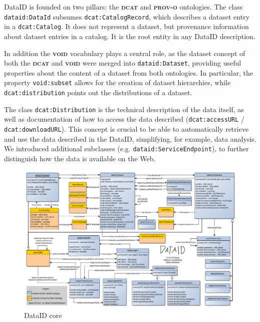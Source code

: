 \documentclass[a4paper,english,twoside,BCOR1.5cm,headsepline,DIV12,appendixprefix,final,12pt]{scrbook}
\newcommand{\prov}{{\scshape\bfseries prov-o}\xspace}
\newcommand{\void}{{\scshape\bfseries void}\xspace}
\newcommand{\dcat}{{\scshape\bfseries dcat}\xspace}
\newcommand{\prop}[1]{{{\texttt{#1}}}}
\begin{document}
DataID is founded on two pillars: the \dcat and \prov ontologies. The class \prop{dataid:DataId} subsumes \prop{dcat:CatalogRecord}, which describes a dataset entry in a \prop{dcat:Catalog}. It does not represent a dataset, but provenance information about dataset entries in a catalog. It is the root entity in any DataID description. 

In addition the \void vocabulary plays a central role, as the dataset concept of both the \dcat and \void were merged into \prop{dataid:Dataset}, providing useful properties about the content of a dataset from both ontologies. In particular, the property \prop{void:subset} allows for the creation of dataset hierarchies, while \prop{dcat:distribution} points out the distributions of a dataset.

The class \prop{dcat:Distribution} is the technical description of the data itself, as well as documentation of how to access the data described (\prop{dcat:accessURL} / \prop{dcat:downloadURL}). This concept is crucial to be able to automatically retrieve and use the data described in the DataID, simplifying, for example, data analysis. We introduced additional subclasses (e.g. \prop{dataid:ServiceEndpoint}), to further distinguish how the data is available on the Web.

\begin{figure}
\centering
	\vspace*{-0.8cm}
  \includegraphics[angle=90, width=\textwidth]{images/DataIdOntology.png}
  \caption{DataID core}
  \label{fig:core}
\end{figure} 
\end{document}
